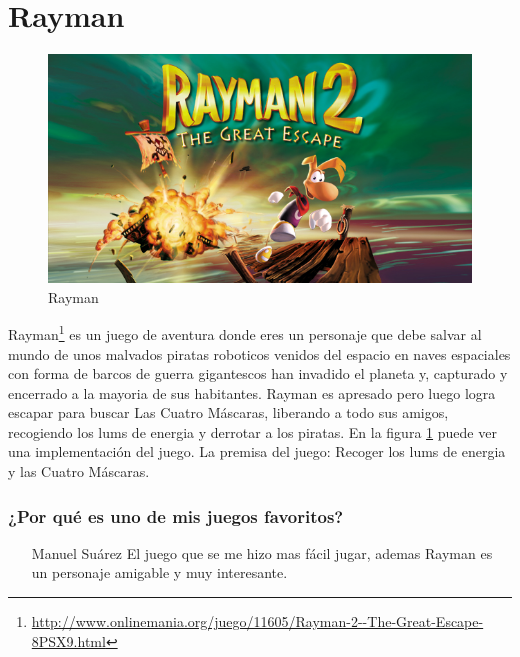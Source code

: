 \section{Rayman}

\begin{figure}[htbp]
\begin{center}
\includegraphics[width=.60\textwidth]{./imagenes/rayman.jpg}
\caption{Rayman}
\label{Rayman}
\end{center}
\end{figure}
Rayman\footnote{\url{http://www.onlinemania.org/juego/11605/Rayman-2--The-Great-Escape-8PSX9.html}} es un juego de aventura donde eres un personaje que debe salvar al mundo de unos malvados piratas roboticos venidos del espacio en naves espaciales con forma de barcos de guerra  gigantescos han invadido el planeta y, capturado y encerrado a la mayoria de sus habitantes. 
Rayman es apresado pero luego logra escapar para buscar Las Cuatro Máscaras, liberando a todo sus amigos, recogiendo los lums de energia y derrotar a los piratas. 
En la figura \ref{Rayman} puede ver una implementación del juego.
La premisa del juego: Recoger los lums de energia y las Cuatro Máscaras.

\subsubsection{¿Por qué es uno de mis juegos favoritos?}
\begin{itemize}
\item[Manuel Suárez] El juego que se me hizo mas fácil jugar, ademas Rayman es un personaje amigable y muy interesante. 

\end{itemize}
